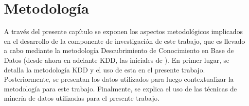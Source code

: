 
\chapter{Metodología}
\label{chp:metodologia}
A través del presente capítulo se exponen los aspectos metodológicos implicados en el desarrollo de la componente de investigación de este trabajo, que es llevado a cabo mediante la metodología Descubrimiento de Conocimiento en Base de Datos (desde ahora en adelante KDD, las iniciales de ). En primer lugar, se detalla la metodología KDD y el uso de esta en el presente trabajo. Posteriormente, se presentan los datos utilizados para luego contextualizar la metodología para este trabajo. Finalmente, se explica el uso de las técnicas de minería de datos utilizadas para el presente trabajo.







%